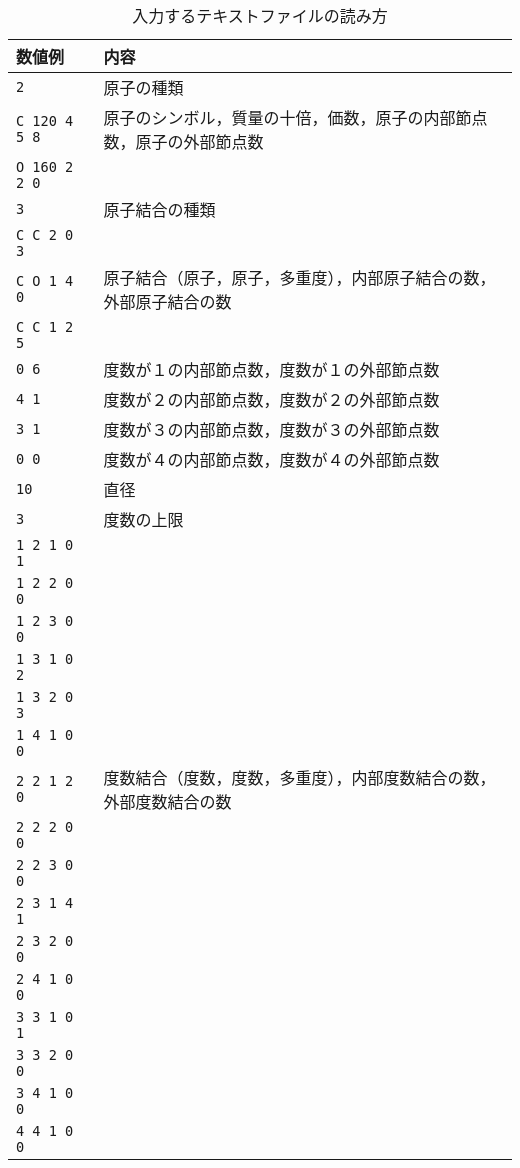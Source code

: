 \documentclass[11pt,titlepage,dvipdfmx,twoside]{jarticle}
\begin{document}
\bigskip
\begin{table}[H]
\begin{center} \caption{入力するテキストファイルの読み方}
\label{tab:InputFormat}
  \begin{tabular}{l|l}
  数値例 & 内容\\ \hline \hline
{\tt  2} & 原子の種類\\ \hline
{\tt  C 120 4 5 8} & 原子のシンボル，質量の十倍，価数，原子の内部節点数，原子の外部節点数\\
{\tt  O 160 2 2 0} & \\ \hline
{\tt  3} & 原子結合の種類　\\ \hline
{\tt  C C 2 0 3} & \\
{\tt  C O 1 4 0} &  原子結合（原子，原子，多重度），内部原子結合の数，外部原子結合の数　\\
{\tt  C C 1 2 5} & \\ \hline
{\tt  0 6} & 度数が１の内部節点数，度数が１の外部節点数　\\ 
{\tt  4 1} & 度数が２の内部節点数，度数が２の外部節点数 \\
{\tt  3 1} & 度数が３の内部節点数，度数が３の外部節点数　\\
{\tt  0 0} & 度数が４の内部節点数，度数が４の外部節点数　\\ \hline
{\tt  10} & 直径　\\ \hline
{\tt  3} & 度数の上限　\\ \hline
{\tt  1 2 1 0 1} & \\
{\tt  1 2 2 0 0} & \\
{\tt  1 2 3 0 0} & \\
{\tt  1 3 1 0 2} & \\
{\tt  1 3 2 0 3} & \\
{\tt  1 4 1 0 0} & \\
{\tt  2 2 1 2 0} & 度数結合（度数，度数，多重度），内部度数結合の数，外部度数結合の数 \\
{\tt  2 2 2 0 0} & \\
{\tt  2 2 3 0 0} & \\
{\tt  2 3 1 4 1} & \\
{\tt  2 3 2 0 0} & \\
{\tt  2 4 1 0 0} & \\
{\tt  3 3 1 0 1} & \\
{\tt  3 3 2 0 0} & \\
{\tt  3 4 1 0 0} & \\
{\tt  4 4 1 0 0} & \\ \hline
  \end{tabular}
\end{center}
\end{table}
\end{document}
